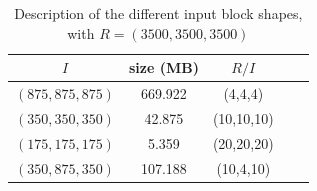 \documentclass[conference]{IEEEtran}
\begin{document}
\begin{table}[ht]
  \centering
  \caption{Description of the different input block shapes, with $R=(3500,3500,3500)$}

   \begin{tabular}[t]{| c | c | c | c | c |}
   \hline
   $I$ & size (MB) & $R/I$ \\
   \hline
   $(875,875,875)$ & 669.922 & (4,4,4) \\
   \hline
   $(350,350,350)$ & 42.875 & (10,10,10) \\
   \hline
   $(175,175,175)$ & 5.359 & (20,20,20) \\
   \hline
   $(350,875,350)$ & 107.188 & (10,4,10) \\
   \hline
   \end{tabular}

   \label{tab:exp_inblocks}

\end{table}
\end{document}
